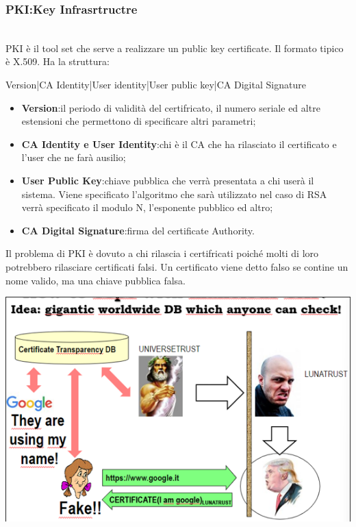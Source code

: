 \documentclass{book}
\theoremstyle{remark}
\begin{document}
\subsubsection{PKI:\@Public Key Infrasrtructre}\mbox{}\\
PKI è il tool set che serve a realizzare un public key certificate\@. Il formato tipico è X\@.509\@. Ha la struttura:\begin{center}
	Version|CA Identity|User identity|User public key|CA Digital Signature
\end{center}
\begin{itemize}
	\item \textbf{Version}:\@Contiene il periodo di validità del certifricato, il numero seriale ed altre estensioni che permettono di specificare altri parametri;\@
	\item \textbf{CA Identity e User Identity}:\@Specifica chi è il CA che ha rilasciato il certificato e l'user che ne farà ausilio;\@
	\item \textbf{User Public Key}:\@La chiave pubblica che verrà presentata a chi userà il sistema\@. Viene specificato l'algoritmo che sarà utilizzato nel caso di RSA verrà specificato il modulo N, l'esponente pubblico ed altro;\@
	\item \textbf{CA Digital Signature}:\@la firma del certificate Authority\@.
\end{itemize}
Il problema di PKI è dovuto a chi rilascia i certifricati poiché molti di loro potrebbero rilasciare certificati falsi\@. Un certificato viene detto falso se contine un nome valido, ma una chiave pubblica falsa\@.\newline
\begin{center}
	\includegraphics[scale=0.6]{2021-12-07-14-30-09.png}
\end{center}
\end{document}
